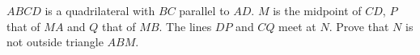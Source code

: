 $ABCD$ is a quadrilateral with $BC$ parallel to $AD$. $M$ is the midpoint of $CD$, $P$ that of $MA$ and $Q$ that of $MB$. The lines $DP$ and $CQ$ meet at $N$. Prove that $N$ is not outside triangle $ABM$.
